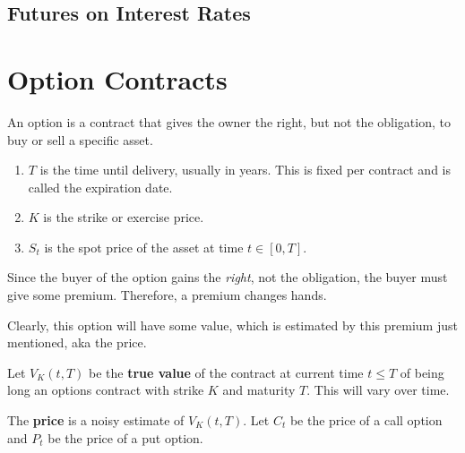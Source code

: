 \documentclass{article}
\begin{document}
  \subsection{Futures on Interest Rates}

\section{Option Contracts}

    \begin{definition}[Options]
      An option is a contract that gives the owner the right, but not the obligation, to buy or sell a specific asset. 
      \begin{enumerate}
        \item $T$ is the time until delivery, usually in years. This is fixed per contract and is called the expiration date. 
        \item $K$ is the strike or exercise price. 
        \item $S_t$ is the spot price of the asset at time $t \in [0, T]$. 
      \end{enumerate}
      Since the buyer of the option gains the \textit{right}, not the obligation, the buyer must give some premium. Therefore, a premium changes hands. 
    \end{definition}

    Clearly, this option will have some value, which is estimated by this premium just mentioned, aka the price. 

    \begin{definition}[Value]
      Let $V_K (t, T)$ be the \textbf{true value} of the contract at current time $t \leq T$ of being long an options contract with strike $K$ and maturity $T$. This will vary over time. 

      The \textbf{price} is a noisy estimate of $V_K (t, T)$. Let $C_t$ be the price of a call option and $P_t$ be the price of a put option.
    \end{definition}
\end{document}
